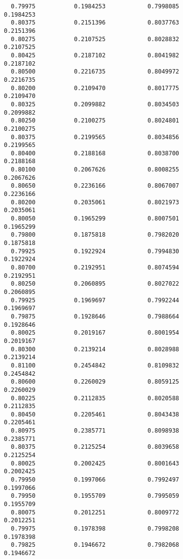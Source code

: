 \documentclass[
  letterpaper,
  DIV=11,
  numbers=noendperiod]{scrartcl}
\begin{document}
\begin{verbatim}
  0.79975           0.1984253            0.7998085            0.1984253     
  0.80375           0.2151396            0.8037763            0.2151396     
  0.80275           0.2107525            0.8028832            0.2107525     
  0.80425           0.2187102            0.8041982            0.2187102     
  0.80500           0.2216735            0.8049972            0.2216735     
  0.80200           0.2109470            0.8017775            0.2109470     
  0.80325           0.2099882            0.8034503            0.2099882     
  0.80250           0.2100275            0.8024801            0.2100275     
  0.80375           0.2199565            0.8034856            0.2199565     
  0.80400           0.2188168            0.8038700            0.2188168     
  0.80100           0.2067626            0.8008255            0.2067626     
  0.80650           0.2236166            0.8067007            0.2236166     
  0.80200           0.2035061            0.8021973            0.2035061     
  0.80050           0.1965299            0.8007501            0.1965299     
  0.79800           0.1875818            0.7982020            0.1875818     
  0.79925           0.1922924            0.7994830            0.1922924     
  0.80700           0.2192951            0.8074594            0.2192951     
  0.80250           0.2060895            0.8027022            0.2060895     
  0.79925           0.1969697            0.7992244            0.1969697     
  0.79875           0.1928646            0.7988664            0.1928646     
  0.80025           0.2019167            0.8001954            0.2019167     
  0.80300           0.2139214            0.8028988            0.2139214     
  0.81100           0.2454842            0.8109832            0.2454842     
  0.80600           0.2260029            0.8059125            0.2260029     
  0.80225           0.2112835            0.8020588            0.2112835     
  0.80450           0.2205461            0.8043438            0.2205461     
  0.80975           0.2385771            0.8098938            0.2385771     
  0.80375           0.2125254            0.8039658            0.2125254     
  0.80025           0.2002425            0.8001643            0.2002425     
  0.79950           0.1997066            0.7992497            0.1997066     
  0.79950           0.1955709            0.7995059            0.1955709     
  0.80075           0.2012251            0.8009772            0.2012251     
  0.79975           0.1978398            0.7998208            0.1978398     
  0.79825           0.1946672            0.7982068            0.1946672     

\end{verbatim}
\end{document}

